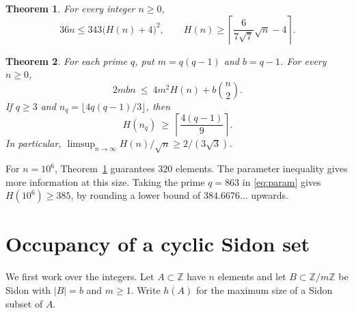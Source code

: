 \documentclass[11pt]{article}
\newtheorem{theorem}{Theorem}
\newcommand{\Z}{\mathbb Z}
\begin{document}
\begin{theorem}\label{th:main}
For every integer \(n\ge0\),
\[
  36n\le343\bigl(H(n)+4\bigr)^2,\qquad
  H(n)\ge\left\lceil \frac{6}{7\sqrt7}\sqrt n-4\right\rceil .
\]
\end{theorem}

\begin{theorem}\label{th:param}
For each prime \(q\), put \(m=q(q-1)\) and \(b=q-1\). For every \(n\ge0\),
\begin{equation}\label{eq:param}
  2mbn\ \le\ 4m^2 H(n)+b\binom n2 .
\end{equation}
If \(q\ge3\) and \(n_q=\lfloor4q(q-1)/3\rfloor\), then
\[
  H(n_q)\ \ge\ \left\lceil\frac{4(q-1)}9\right\rceil .
\]
In particular,
\(\displaystyle\limsup_{n\to\infty}H(n)/\sqrt n\ge2/(3\sqrt3)\).
\end{theorem}

For \(n=10^6\), Theorem~\ref{th:main} guarantees \(320\) elements.
The parameter inequality gives more information at this size. Taking
the prime \(q=863\) in \eqref{eq:param} gives \(H(10^6)\ge385\),
by rounding a lower bound of \(384.6676\ldots\) upwards.

\section{Occupancy of a cyclic Sidon set}

We first work over the integers. Let \(A\subset\Z\) have \(n\) elements
and let \(B\subset\Z/m\Z\) be Sidon with \(|B|=b\) and \(m\ge1\).
Write \(h(A)\) for the maximum size of a Sidon subset of \(A\).
\end{document}
